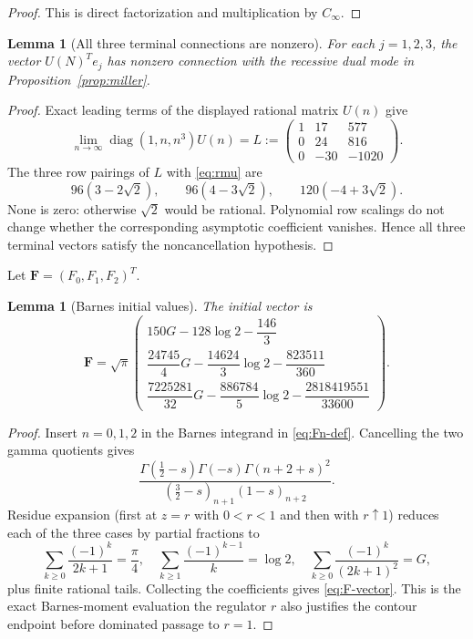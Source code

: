 \documentclass[11pt]{article}
\newtheorem{lemma}[theorem]{Lemma}
\theoremstyle{remark}
\newcommand{\diag}{\operatorname{diag}}
\begin{document}
\begin{proof}
This is direct factorization and multiplication by $C_\infty$.
\end{proof}

\begin{lemma}[All three terminal connections are nonzero]
\label{lem:terminal-connections}
For each $j=1,2,3$, the vector $U(N)^Te_j$ has nonzero connection
with the recessive dual mode in Proposition~\ref{prop:miller}.
\end{lemma}

\begin{proof}
Exact leading terms of the displayed rational matrix $U(n)$ give
\begin{equation}\label{eq:U-limit}
 \lim_{n\to\infty}\diag(1,n,n^3)U(n)
 =L:=\begin{pmatrix}1&17&577\\0&24&816\\0&-30&-1020\end{pmatrix}.
\end{equation}
The three row pairings of $L$ with \eqref{eq:rmu} are
\[
 96(3-2\sqrt2),\qquad 96(4-3\sqrt2),\qquad
 120(-4+3\sqrt2).
\]
None is zero: otherwise $\sqrt2$ would be rational.  Polynomial row
scalings do not change whether the corresponding asymptotic
coefficient vanishes.  Hence all three terminal vectors satisfy the
noncancellation hypothesis.
\end{proof}

Let $\mathbf F=(F_0,F_1,F_2)^T$.

\begin{lemma}[Barnes initial values]\label{lem:initial-F}
The initial vector is
\begin{equation}\label{eq:F-vector}
\mathbf F=\sqrt\pi\begin{pmatrix}
150G-128\log2-\dfrac{146}{3}\\[3pt]
\dfrac{24745}{4}G-\dfrac{14624}{3}\log2-\dfrac{823511}{360}\\[3pt]
\dfrac{7225281}{32}G-\dfrac{886784}{5}\log2
 -\dfrac{2818419551}{33600}
\end{pmatrix}.
\end{equation}
\end{lemma}

\begin{proof}
Insert $n=0,1,2$ in the Barnes integrand in
\eqref{eq:Fn-def}.  Cancelling the two gamma quotients gives
\[
 \frac{\Gamma(\frac12-s)\Gamma(-s)\Gamma(n+2+s)^2}
 {(\frac32-s)_{n+1}(1-s)_{n+2}}.
\]
Residue expansion (first at $z=r$ with $0<r<1$ and then with
$r\uparrow1$) reduces each of the three cases by partial
fractions to
\[
 \sum_{k\geq0}\frac{(-1)^k}{2k+1}=\frac\pi4,\quad
 \sum_{k\geq1}\frac{(-1)^{k-1}}k=\log2,\quad
 \sum_{k\geq0}\frac{(-1)^k}{(2k+1)^2}=G,
\]
plus finite rational tails.  Collecting the coefficients gives
\eqref{eq:F-vector}.  This is the exact Barnes-moment evaluation
the regulator
$r$ also justifies the contour endpoint before dominated passage to
$r=1$.
\end{proof}
\end{document}
